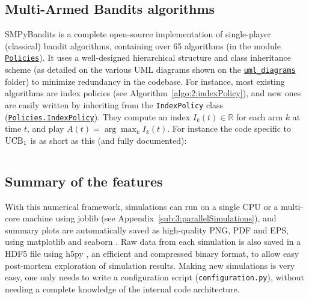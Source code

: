 \subsection{Multi-Armed Bandits algorithms}

SMPyBandits is a complete open-source implementation of single-player (classical) bandit algorithms,
containing over 65 algorithms (in the module \texttt{\href{https://SMPyBandits.GitHub.io/docs/Policies.html}{Policies}}).
It uses a well-designed hierarchical structure and class inheritance scheme (as detailed on the various UML diagrams shown on the \texttt{\href{https://SMPyBandits.GitHub.io/uml_diagrams/README.html}{uml\_diagrams}} folder) to minimize redundancy in the codebase.
For instance, most existing algorithms are index policies (see Algorithm~\ref{algo:2:indexPolicy}), and new ones are easily written by inheriting from the \texttt{IndexPolicy} class (\texttt{\href{https://SMPyBandits.GitHub.io/docs/Policies.IndexPolicy.html}{Policies.IndexPolicy}}).
They compute an index $I_k(t)\in\mathbb{R}$ for each arm $k$ at time $t$, and play $A(t) = \arg\max_k I_k(t)$.
For instance the code specific to $\mathrm{UCB}_1$ is as short as this (and fully documented):

\begin{small}
    \inputminted[linenos=true,numbersep=5pt,frame=lines,framesep=2mm]{python3}{2-Chapters/3-Chapter/src/example_of_a_IndexPolicy_UCB.py}
\end{small}


\subsection{Summary of the features}

With this numerical framework, simulations can run on a single CPU or a multi-core machine using joblib \cite{joblib} (see Appendix~\ref{sub:3:parallelSimulations}),
and summary plots are automatically saved as high-quality PNG, PDF and EPS, using matplotlib \cite{matplotlib} and seaborn \cite{seaborn}.
Raw data from each simulation is also saved in a HDF5 file using h5py \cite{h5py}, an efficient and compressed binary format, to allow easy post-mortem exploration of simulation results.
Making new simulations is very easy, one only needs to write a configuration script (\texttt{configuration.py}), without needing a complete knowledge of the internal code architecture.



